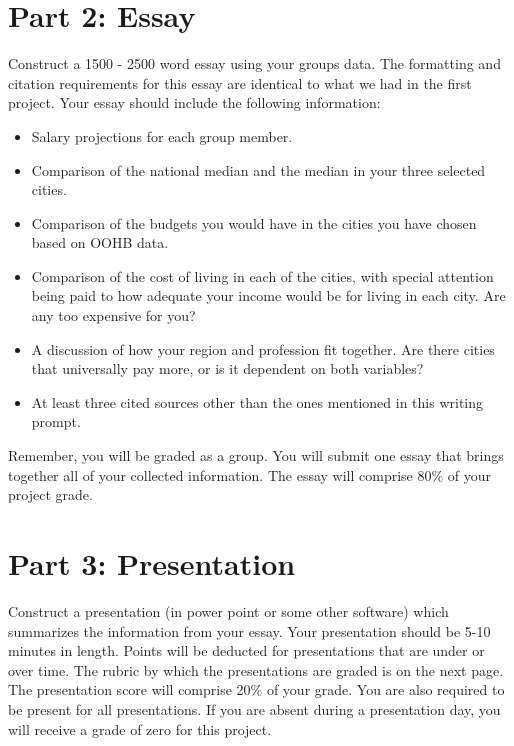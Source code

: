 \documentclass{article}
\begin{document}
\section*{Part 2: Essay}
Construct a 1500 - 2500 word essay using your groups data. The formatting and citation
requirements for this essay are identical to what we had in the first project.  Your essay should include the following information:
\begin{itemize}
	\item Salary projections for each group member.
	\item Comparison of the national median and the median in your three selected cities.
	\item Comparison of the budgets you would have in the cities you have chosen based on OOHB data.
	\item Comparison of the cost of living in each of the cities, with special attention being paid to how adequate your income would be for living in each city.  Are any too expensive for you?
	\item A discussion of how your region and profession fit together.  Are there cities that universally pay more, or is it dependent on both variables?
	\item At least three cited sources other than the ones mentioned in this writing prompt.
\end{itemize}

Remember, you will be graded as a group.  You will submit one essay that brings together all of your collected information.  The essay will comprise 80\% of your project grade.

\section*{Part 3: Presentation}
Construct a presentation (in power point or some other software) which summarizes the information from your essay.  Your presentation should be 5-10 minutes in length.  Points will be deducted for presentations that are under or over time.  The rubric by which the presentations are graded is on the next page.  The presentation score will comprise 20\% of your grade.  You are also required to be present for all presentations.  If you are absent during a presentation day, you will receive a grade of zero for this project.


\end{document}
